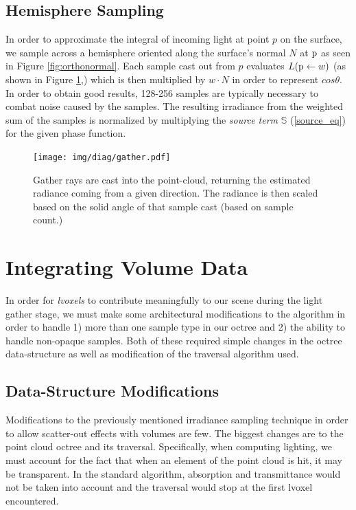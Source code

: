 \documentclass[12pt]{ucthesis}
\newcommand{\captionfonts}{\small\bf\ssp}
\begin{document}
\subsection{Hemisphere Sampling}

In order to approximate the integral of incoming light at point $p$ on the surface, we sample across a hemisphere oriented along the surface's normal $N$ at $\textup{p}$ as seen in Figure \ref{fig:orthonormal}.  Each sample cast out from $p$ evaluates $L(\textup{p} \leftarrow w)$ (as shown in Figure \ref{fig:gather},) which is then multiplied by $w \cdot N$ in order to represent $cos\theta$.  In order to obtain good results, 128-256 samples are typically necessary to combat noise caused by the samples.  The resulting irradiance from the weighted sum of the samples is normalized by multiplying the \textit{source term} $\mathbb{S}$ (\ref{source_eq}) for the given phase function. 

\begin{figure}[h!]
    \centering
    \texttt{[image: img/diag/gather.pdf]}
    \captionfonts
    \caption{Gather rays are cast into the point-cloud, returning the estimated radiance coming from a given direction.  The radiance is then scaled based on the solid angle of that sample cast (based on sample count.)}
    \label{fig:gather}
\end{figure}

\section{Integrating Volume Data}
In order for \textit{lvoxels} to contribute meaningfully to our scene during the light gather stage, we must make some architectural modifications to the algorithm in order to handle 1) more than one sample type in our octree and 2) the ability to handle non-opaque samples.  Both of these required simple changes in the octree data-structure as well as modification of the traversal algorithm used.

\subsection{Data-Structure Modifications}
Modifications to the previously mentioned irradiance sampling technique in order to allow scatter-out effects with volumes are few.  The biggest changes are to the point cloud octree and its traversal.  Specifically, when computing lighting, we must account for the fact that when an element of the point cloud is hit, it may be transparent.  In the standard algorithm, absorption and transmittance would not be taken into account and the traversal would stop at the first lvoxel encountered.
\end{document}
